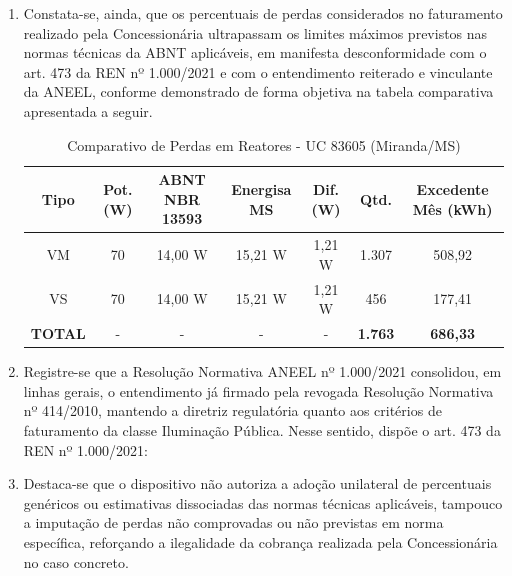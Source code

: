 \begin{enumerate}[resume]
\item %
Constata-se, ainda, que os percentuais de perdas considerados no faturamento realizado pela Concessionária ultrapassam os limites máximos previstos nas normas técnicas da ABNT aplicáveis, em manifesta desconformidade com o art. 473 da REN nº 1.000/2021 e com o entendimento reiterado e vinculante da ANEEL, conforme demonstrado de forma objetiva na tabela comparativa apresentada a seguir. 

\begin{table}[h!]
\centering
\small
\begin{tabular}{|c|c|c|c|c|c|c|}
\hline
\textbf{Tipo} & \textbf{Pot. (W)} & \textbf{ABNT NBR 13593} & \textbf{Energisa MS} & \textbf{Dif. (W)} & \textbf{Qtd.} & \textbf{Excedente Mês (kWh)} \\ \hline
VM & 70 & 14,00 W & 15,21 W & 1,21 W & 1.307 & 508,92 \\ \hline
VS & 70 & 14,00 W & 15,21 W & 1,21 W & 456 & 177,41 \\ \hline
\textbf{TOTAL} & - & - & - & - & \textbf{1.763} & \textbf{686,33} \\ \hline
\end{tabular}
\caption{Comparativo de Perdas em Reatores - UC 83605 (Miranda/MS)}
\end{table}

\item %
Registre-se que a Resolução Normativa ANEEL nº 1.000/2021 consolidou, em linhas 
gerais, o entendimento já firmado pela revogada Resolução Normativa nº 414/2010, 
mantendo a diretriz regulatória quanto aos critérios de faturamento da classe 
Iluminação Pública. Nesse sentido, dispõe o art. 473 da REN nº 1.000/2021: 

\fi

\ifperdaVapor
\item %
Destaca-se que o dispositivo não autoriza a adoção unilateral de percentuais genéricos ou estimativas dissociadas das normas técnicas aplicáveis, tampouco a imputação de perdas não comprovadas ou não previstas em norma específica, reforçando a ilegalidade da cobrança realizada pela Concessionária no caso concreto.
\fi


\end{enumerate}
